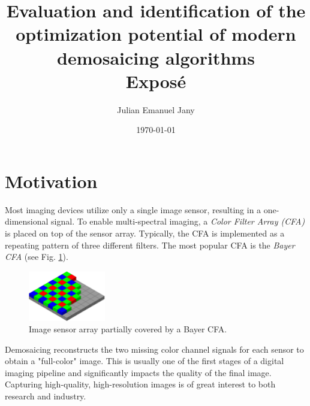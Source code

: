 \documentclass[english,notitlepage,smartquotes]{hgbreport}
\author{Julian Emanuel Jany}                     %
\title{Evaluation and identification of the optimization potential of modern demosaicing algorithms \\ %
			 \textbf{Exposé}}
\date{\today}
\begin{document}
\maketitle



\section{Motivation}

Most imaging devices utilize only a single image sensor, resulting in a one-dimensional signal. To enable multi-spectral imaging, a \emph{Color Filter Array (CFA)} is placed on top of the sensor array. Typically, the CFA is implemented as a repeating pattern of three different filters. The most popular CFA is the \emph{Bayer CFA} (see Fig. \ref{fig:bayer_cfa}).
\begin{figure}[]
	\centering
	\includegraphics[width=0.3\textwidth]{bayer_pattern}
\caption{Image sensor array partially covered by a Bayer CFA. \cite{BayerCFA}}
\label{fig:bayer_cfa}
\end{figure}

Demosaicing reconstructs the two missing color channel signals for each sensor to obtain a "full-color" image. This is usually one of the first stages of a digital imaging pipeline and significantly impacts the quality of the final image. Capturing high-quality, high-resolution images is of great interest to both research and industry. %
\end{document}
